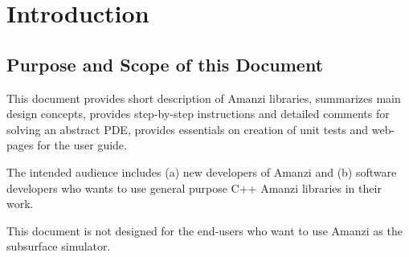 
\section{Introduction}

\subsection{Purpose and Scope of this Document}
This document provides short description of Amanzi libraries, summarizes 
main design concepts, provides step-by-step instructions and detailed comments for solving 
an abstract PDE, provides essentials on creation of unit tests and web-pages for the user guide.

The intended audience includes (a) new developers of Amanzi and (b) software developers
who wants to use general purpose C++ Amanzi libraries in their work. 

This document is not designed for the end-users who want to use Amanzi as the 
subsurface simulator.








